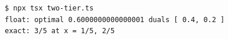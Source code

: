 \begin{Verbatim}[fontsize=\small,frame=leftline,rulecolor=\color{accentmid},framesep=3mm,xleftmargin=3mm]
$ npx tsx two-tier.ts
float: optimal 0.6000000000000001 duals [ 0.4, 0.2 ]
exact: 3/5 at x = 1/5, 2/5
\end{Verbatim}
